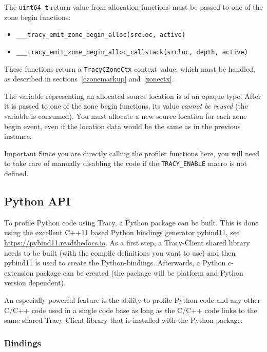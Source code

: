 \documentclass[hidelinks,titlepage,a4paper,twoside]{article}
\begin{document}
The \texttt{uint64\_t} return value from allocation functions must be passed to one of the zone
begin functions:

\begin{itemize}
\item \texttt{\_\_\_tracy\_emit\_zone\_begin\_alloc(srcloc, active)}
\item \texttt{\_\_\_tracy\_emit\_zone\_begin\_alloc\_callstack(srcloc, depth, active)}
\end{itemize}


These functions return a \texttt{TracyCZoneCtx} context value, which must be handled, as described
in sections~\ref{czonemarkup} and~\ref{zonectx}.

The variable representing an allocated source location is of an opaque type. After it is passed to one of the zone begin functions, its value \emph{cannot be reused} (the variable is consumed). You must allocate a new source location for each zone begin event, even if the location data would be the same as in the previous instance.

\begin{bclogo}[
noborder=true,
couleur=black!5,
logo=\bcbombe
]{Important}
Since you are directly calling the profiler functions here, you will need to take care of manually
disabling the code if the \texttt{TRACY\_ENABLE} macro is not defined.
\end{bclogo}

\subsection{Python API}
\label{pythonapi}

To profile Python code using Tracy, a Python package can be built. This is done using the excellent C++11 based Python bindings generator pybind11, see \url{https://pybind11.readthedocs.io}.
As a first step, a Tracy-Client shared library needs to be built (with the compile definitions you want to use) and then pybind11 is used to create the Python-bindings.
Afterwards, a Python c-extension package can be created (the package will be platform and Python version dependent).

An especially powerful feature is the ability to profile Python code and any other C/C++ code used in a single code base as long as the C/C++ code links to the same shared Tracy-Client library that is installed with the Python package.

\subsubsection{Bindings}
\end{document}
